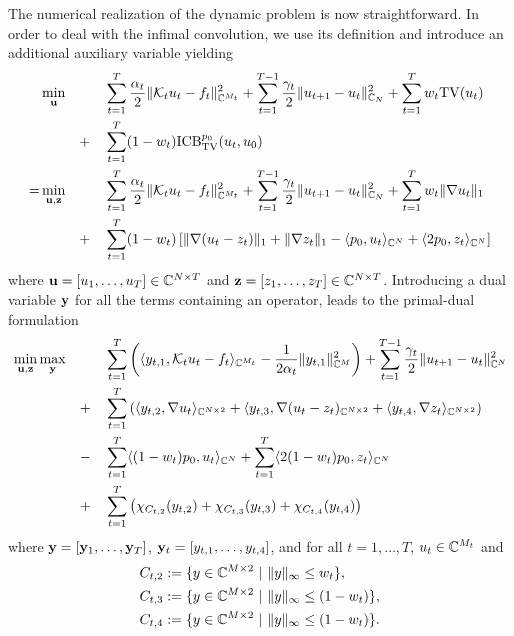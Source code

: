 The numerical realization of the dynamic problem is now straightforward.
In order to deal with the infimal convolution, we use its definition and introduce an additional auxiliary variable yielding 
\begin{alignat*}{4}
	&\min_{\mathbf{u}}&& ~ &&\sum_{t=1}^T \frac{\alpha_t}{2} \| \mathcal{K}_t u_t - f_t \|_{\mathbb{C}^{M_t}}^2 + \sum_{t=1}^{T-1} \frac{\gamma_t}{2} \|u_{t+1} - u_t \|_{\mathbb{C}_N}^2 + \sum_{t=1}^T w_t \mathrm{TV}(u_t) \\
	& && + && \sum_{t=1}^T (1-w_t) \mathrm{ICB}_{\mathrm{TV}}^{p_0}(u_t,u_0) \\    
   = &\min_{\mathbf{u},\mathbf{z}}&& ~ &&\sum_{t=1}^T \frac{\alpha_t}{2} \| \mathcal{K}_t u_t - f_t \|_{\mathbb{C}^{M_t}}^2 + \sum_{t=1}^{T-1} \frac{\gamma_t}{2} \|u_{t+1} - u_t \|_{\mathbb{C}_N}^2 +\sum_{t=1}^T w_t \| \nabla u_t \|_1\\
   & && + &&\sum_{t=1}^T (1-w_t) \left[ \| \nabla (u_t - z_t) \|_1 + \| \nabla z_t \|_1  - \langle p_0,u_t \rangle_{\mathbb{C}^N} + \langle 2 p_0, z_t \rangle_{\mathbb{C}^N} \right]
\end{alignat*}
where $\mathbf{u} = [u_1, \dots, u_T] \in \mathbb{C}^{N \times T}$ and $\mathbf{z} = [z_1, \dots, z_T] \in \mathbb{C}^{N \times T}$.
Introducing a dual variable $\mathbf{y}$ for all the terms containing an operator, leads to the primal-dual formulation 
\begin{alignat}{4}
\label{eq:primal_dual}
	&\min_{\mathbf{u},\mathbf{z}} \max_{\mathbf{y}} && ~ && \sum_{t=1}^T \left(\langle y_{t,1}, \mathcal{K}_t u_t - f_t \rangle_{\mathbb{C}^{M_t}} - \frac{1}{2 \alpha_t} \|y_{t,1} \|_{\mathbb{C}^M}^2 \right) + \sum_{t=1}^{T-1} \frac{\gamma_t}{2} \| u_{t+1} - u_t \|_{\mathbb{C}^N}^2 \notag \\
    & && + && \sum_{t=1}^T \left(\langle y_{t,2}, \nabla u_t \rangle_{\mathbb{C}^{N \times 2}} + \langle y_{t,3}, \nabla (u_t - z_t) _{\mathbb{C}^{N \times 2}} + \langle y_{t,4}, \nabla z_t \rangle_{\mathbb{C}^{N \times 2}}\right) \notag \\
    & && - && \sum_{t=1}^T \langle (1-w_t)p_0,u_t \rangle_{\mathbb{C}^N} + \sum_{t=1}^T \langle 2(1-w_t)p_0,z_t \rangle_{\mathbb{C}^N}  \notag \\
    & && + && \sum_{t=1}^T \left(\chi_{C_{t,2}}(y_{t,2}) + \chi_{C_{t,3}}(y_{t,3}) + \chi_{C_{t,4}}(y_{t,4})\right)
\end{alignat}
where $\mathbf{y} = [\mathbf{y}_1, \dots, \mathbf{y}_T]$, $\mathbf{y}_t = [y_{t,1}, \dots, y_{t,4}]$, and for all $t = 1, \dots, T$, $u_{t} \in \mathbb{C}^{M_t}$ and
\begin{align*}
	&C_{t,2} := \{ y \in \mathbb{C}^{M \times 2} ~|~ \|y \|_{\infty} \leq w_t \}, \\
    &C_{t,3} := \{ y \in \mathbb{C}^{M \times 2} ~|~ \|y \|_{\infty} \leq (1-w_t) \}, \\
    &C_{t,4} := \{ y \in \mathbb{C}^{M \times 2} ~|~ \|y \|_{\infty} \leq (1-w_t) \}. \\
\end{align*}
